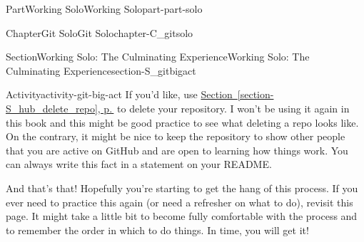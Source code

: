 \documentclass[twoside,10pt,]{book}
\newcommand{\xreffont}{\relax}
\begin{document}
\begin{partptx}{Part}{Working Solo}{}{Working Solo}{}{}{part-part-solo}
\begin{chapterptx}{Chapter}{Git Solo}{}{Git Solo}{}{}{chapter-C_gitsolo}
\begin{sectionptx}{Section}{Working Solo: The Culminating Experience}{}{Working Solo: The Culminating Experience}{}{}{section-S_gitbigact}
\begin{activity}{Activity}{}{activity-git-big-act}
If you'd like, use \hyperref[section-S_hub_delete_repo]{Section~{\xreffont\ref{section-S_hub_delete_repo}}, p.\,\pageref{section-S_hub_delete_repo}} to delete your repository. I won't be using it again in this book and this might be good practice to see what deleting a repo looks like. On the contrary, it might be nice to keep the repository to show other people that you are active on GitHub and are open to learning how things work. You can always write this fact in a statement on your README.%
\end{activity}%
And that's that! Hopefully you're starting to get the hang of this process. If you ever need to practice this again (or need a refresher on what to do), revisit this page. It might take a little bit to become fully comfortable with the process and to remember the order in which to do things. In time, you will get it!%
\end{sectionptx}
\end{chapterptx}
\end{partptx}
%
%
\typeout{************************************************}
\typeout{************************************************}
%
\end{document}
